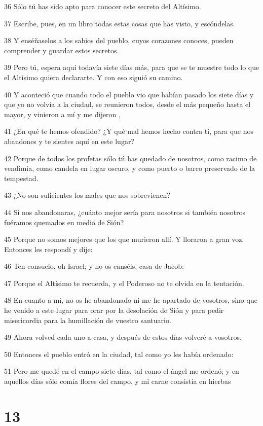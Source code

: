 \par 36 Sólo tú has sido apto para conocer este secreto del Altísimo.
\par 37 Escribe, pues, en un libro todas estas cosas que has visto, y escóndelas.
\par 38 Y enséñaselos a los sabios del pueblo, cuyos corazones conoces, pueden comprender y guardar estos secretos.
\par 39 Pero tú, espera aquí todavía siete días más, para que se te muestre todo lo que el Altísimo quiera declararte. Y con eso siguió su camino.
\par 40 Y aconteció que cuando todo el pueblo vio que habían pasado los siete días y que yo no volvía a la ciudad, se reunieron todos, desde el más pequeño hasta el mayor, y vinieron a mí y me dijeron ,
\par 41 ¿En qué te hemos ofendido? ¿Y qué mal hemos hecho contra ti, para que nos abandones y te sientes aquí en este lugar?
\par 42 Porque de todos los profetas sólo tú has quedado de nosotros, como racimo de vendimia, como candela en lugar oscuro, y como puerto o barco preservado de la tempestad.
\par 43 ¿No son suficientes los males que nos sobrevienen?
\par 44 Si nos abandonaras, ¿cuánto mejor sería para nosotros si también nosotros fuéramos quemados en medio de Sión?
\par 45 Porque no somos mejores que los que murieron allí. Y lloraron a gran voz. Entonces les respondí y dije:
\par 46 Ten consuelo, oh Israel; y no os canséis, casa de Jacob:
\par 47 Porque el Altísimo te recuerda, y el Poderoso no te olvida en la tentación.
\par 48 En cuanto a mí, no os he abandonado ni me he apartado de vosotros, sino que he venido a este lugar para orar por la desolación de Sión y para pedir misericordia para la humillación de vuestro santuario.
\par 49 Ahora volved cada uno a casa, y después de estos días volveré a vosotros.
\par 50 Entonces el pueblo entró en la ciudad, tal como yo les había ordenado:
\par 51 Pero me quedé en el campo siete días, tal como el ángel me ordenó; y en aquellos días sólo comía flores del campo, y mi carne consistía en hierbas

\chapter{13}

